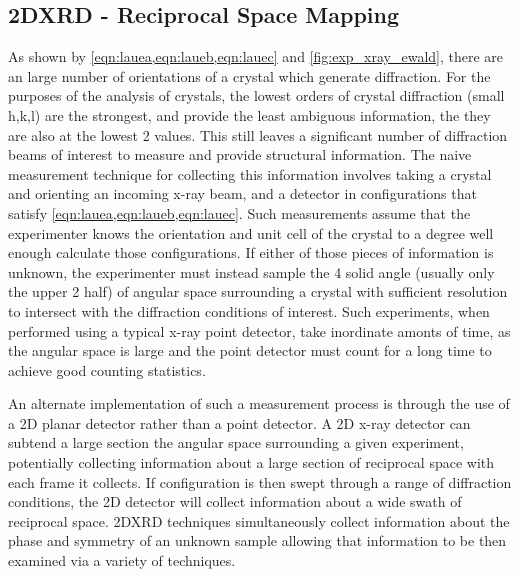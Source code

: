 \subsection{2DXRD - Reciprocal Space Mapping}
\label{sec:2DXRD} As shown by \cref{eqn:lauea,eqn:laueb,eqn:lauec} and \cref{fig:exp_xray_ewald}, there are an large number of orientations of a crystal which generate diffraction. For the purposes of the analysis of crystals, the lowest orders of crystal diffraction (small h,k,l) are the strongest, and provide the least ambiguous information, the they are also at the lowest 2\straighttheta{} values. This still leaves a significant number of diffraction beams of interest to measure and provide structural information. The naive measurement technique for collecting this information involves taking a crystal and orienting an incoming x-ray beam, and a detector in configurations that satisfy \cref{eqn:lauea,eqn:laueb,eqn:lauec}. Such measurements assume that the experimenter knows the orientation and unit cell of the crystal to a degree well enough calculate those configurations. If either of those pieces of information is unknown, the experimenter must instead sample the 4\textpi{} solid angle (usually only the upper 2\textpi{} half) of angular space surrounding a crystal with sufficient resolution to intersect with the diffraction conditions of interest. Such experiments, when performed using a typical x-ray point detector, take inordinate amonts of time, as the angular space is large and the point detector must count for a long time to achieve good counting statistics.

An alternate implementation of such a measurement process is through the use of a 2D planar detector rather than a point detector. A 2D x-ray detector can subtend a large section the angular space surrounding a given experiment, potentially collecting information about a large section of reciprocal space with each frame it collects. If configuration is then swept through a range of diffraction conditions, the 2D detector will collect information about a wide swath of reciprocal space. 2DXRD techniques simultaneously collect information about the phase and symmetry of an unknown sample allowing that information to be then examined via a variety of techniques.


